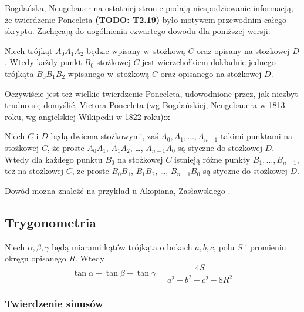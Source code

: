 
Bogdańska, Neugebauer \cite[s. 267]{neugebauer_2018} na ostatniej stronie podają niespodziewanie informacją, że twierdzenie Ponceleta {\color{red}\textbf{(TODO: T2.19)}\color{black}} było motywem przewodnim całego skryptu.
Zachęcają do uogólnienia czwartego dowodu dla poniższej wersji:

\begin{theorem}
	Niech trójkąt $A_0 A_1 A_2$ będzie wpisany w~stożkową $C$ oraz opisany na stożkowej $D$.
	Wtedy każdy punkt $B_0$ stożkowej $C$ jest wierzchołkiem dokładnie jednego trójkąta $B_0 B_1 B_2$ wpisanego w~stożkową $C$ oraz opisanego na stożkowej $D$.
\end{theorem}

Oczywiście jest też wielkie twierdzenie Ponceleta, udowodnione przez, jak niezbyt trudno się domyślić, Victora Ponceleta \cite[s. 311-317]{poncelet_1865} (wg Bogdańskiej, Neugebauera w 1813 roku, wg angielskiej Wikipedii w 1822 roku):x

\begin{theorem}
	Niech $C$ i $D$ będą dwiema stożkowymi, zaś $A_0, A_1, \ldots, A_{n-1}$ takimi punktami na stożkowej $C$, że proste $A_0A_1$, $A_1A_2$, \ldots, $A_{n-1}A_0$ są styczne do stożkowej $D$.
	Wtedy dla każdego punktu $B_0$ na stożkowej $C$ istnieją różne punkty $B_1, \ldots, B_{n-1}$, też na stożkowej $C$, że proste $B_0B_1$, $B_1B_2$, \ldots, $B_{n-1}B_0$ są styczne do stożkowej $D$.
\end{theorem}

Dowód można znaleźć na przykład u Akopiana, Zasławskiego \cite[s. 93, 61, 67, 115, 124]{akopyan_2007}.


\subsection{Trygonometria}

\begin{proposition}
	Niech $\alpha, \beta, \gamma$ będą miarami kątów trójkąta o bokach $a, b, c$, polu $S$ i promieniu okręgu opisanego $R$.
	Wtedy
	\begin{equation}
		\tan \alpha + \tan \beta + \tan \gamma = \frac{4S}{a^2 + b^2 + c^2 - 8R^2}
	\end{equation}
\end{proposition}

\subsubsection{Twierdzenie sinusów}

